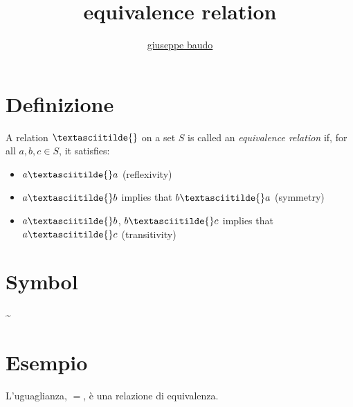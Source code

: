 \documentclass[a4paper,10pt]{article}
\title{equivalence relation}
\author{\href{http://www.baudo.hol.es}{giuseppe baudo}}
\begin{document}
\maketitle

\section{Definizione}
A relation $\textasciitilde{}$ on a set $S$ is called an \textit{equivalence relation} if, for all $a, b, c \in S$, it satisfies:
\begin{itemize}
 \item $a \textasciitilde{} a$ (reflexivity)
 \item $a \textasciitilde{} b$ implies that $b \textasciitilde{} a$ (symmetry)
 \item $a \textasciitilde{} b$, $b \textasciitilde{} c$ implies that $a \textasciitilde{} c$ (transitivity)
\end{itemize}

\section{Symbol}
\textasciitilde{}



\section{Esempio}
L'uguaglianza, $=$, è una relazione di equivalenza.
\end{document}
